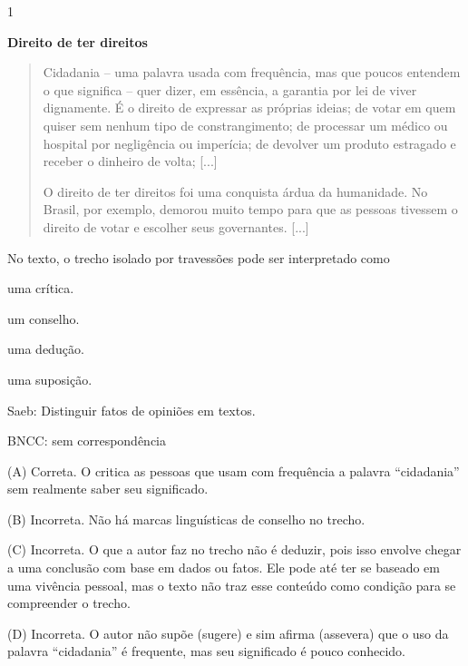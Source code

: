 \num{1}

\textbf{Direito de ter direitos}

\begin{quote}
Cidadania -- uma palavra usada com frequência, mas que poucos entendem o
que significa -- quer dizer, em essência, a garantia por lei de viver
dignamente. É o direito de expressar as próprias ideias; de votar em
quem quiser sem nenhum tipo de constrangimento; de processar um médico
ou hospital por negligência ou imperícia; de devolver um produto
estragado e receber o dinheiro de volta; {[}...{]}

O direito de ter direitos foi uma conquista árdua da humanidade. No
Brasil, por exemplo, demorou muito tempo para que as pessoas tivessem o
direito de votar e escolher seus governantes. {[}...{]}
\end{quote}


No texto, o trecho isolado por travessões pode ser interpretado como

\begin{escolha}
\item uma crítica.

\item um conselho.

\item uma dedução.

\item uma suposição.
\end{escolha}

Saeb: Distinguir fatos de opiniões em textos.

BNCC: sem correspondência

(A) Correta. O critica as pessoas que usam com frequência a palavra
``cidadania'' sem realmente saber seu significado.

(B) Incorreta. Não há marcas linguísticas de conselho no trecho.

(C) Incorreta. O que a autor faz no trecho não é deduzir, pois isso
envolve chegar a uma conclusão com base em dados ou fatos. Ele pode até
ter se baseado em uma vivência pessoal, mas o texto não traz esse
conteúdo como condição para se compreender o trecho.

(D) Incorreta. O autor não supõe (sugere) e sim afirma (assevera) que o
uso da palavra ``cidadania'' é frequente, mas seu significado é pouco
conhecido.

